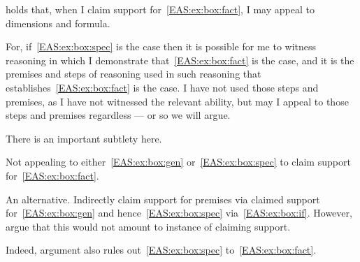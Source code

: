 \begin{note}
  \EAS{} holds that, when I claim support for~\ref{EAS:ex:box:fact}, I may appeal to dimensions and formula.

  For, if~\ref{EAS:ex:box:spec} is the case then it is possible for me to witness reasoning in which I demonstrate that~\ref{EAS:ex:box:fact} is the case, and it is the premises and steps of reasoning used in such reasoning that establishes~\ref{EAS:ex:box:fact} is the case.
  I have not used those steps and premises, as I have not witnessed the relevant ability, but may I appeal to those steps and premises regardless --- or so we will argue.

  There is an important subtlety here.
  {
    \color{red}
    Not appealing to either~\ref{EAS:ex:box:gen} or~\ref{EAS:ex:box:spec} to claim support for~\ref{EAS:ex:box:fact}.

    An alternative.
    Indirectly claim support for premises via claimed support for~\ref{EAS:ex:box:gen} and hence~\ref{EAS:ex:box:spec} via~\ref{EAS:ex:box:if}.
    However, argue that this would not amount to instance of claiming support.

    Indeed, argument also rules out~\ref{EAS:ex:box:spec} to~\ref{EAS:ex:box:fact}.
  }
\end{note}

